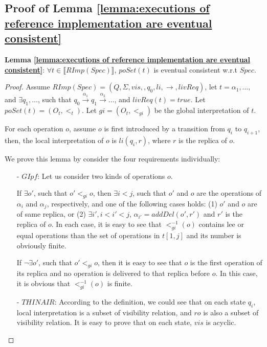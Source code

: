 {\subsection{Proof of Lemma \ref{lemma:executions of reference implementation are eventual consistent}}
\label{subsec:appendix proof of lemma executions of reference implementation are eventual consistent}

{\noindent \bf Lemma \ref{lemma:executions of reference implementation are eventual consistent}}: $\forall t \in \llbracket RImp(Spec) \rrbracket$, $poSet(t)$ is eventual consistent w.r.t $Spec$.

\begin {proof}

Assume $RImp(Spec) = (Q,\Sigma,vis,,q_0,li,\rightarrow,livReq)$, let $t = \alpha_1, \ldots, $ and $\exists q_1,\ldots$, such that $q_0 {\xrightarrow{\alpha_1}} q_1 {\xrightarrow{\alpha_2}} \ldots$, and $livReq(t) = \mathit{true}$. Let $poSet(t)=(O_t,<_t)$. Let $gi = (O_t,<_{gi})$ be the global interpretation of $t$.

For each operation $o$, assume $o$ is first introduced by a transition from $q_i$ to $q_{i+1}$, then, the local interpretation of $o$ is $li(q_i,r)$, where $r$ is the replica of $o$.

We prove this lemma by consider the four requirements individually:

\begin{itemize}
\setlength{\itemsep}{0.5pt}
\item[-] $\mathit{GIpf}$: Let us consider two kinds of operations $o$.

If $\exists o'$, such that $o' <_{gi} o$, then $\exists i < j$, such that $o'$ and $o$ are the operations of $\alpha_i$ and $\alpha_j$, respectively, and one of the following cases holds: (1) $o'$ and $o$ are of same replica, or (2) $\exists i', i < i' < j$, $\alpha_{i'}=addDel(o',r')$ and $r'$ is the replica of $o$. In each case, it is easy to see that $<^{-1}_{gi}(o)$ contains lee or equal operations than the set of operations in $t[1,j]$ and its number is obviously finite.

    If $\neg \exists o'$, such that $o' <_{gi} o$, then it is easy to see that $o$ is the first operation of its replica and no operation is delivered to that replica before $o$. In this case, it is obvious that $<^{-1}_{gi}(o)$ is finite.

\item[-] $\mathit{THINAIR}$: According to the definition, we could see that on each state $q_i$, local interpretation is a subset of visibility relation, and $ro$ is also a subset of visibility relation. It is easy to prove that on each state, $vis$ is acyclic.


\end{itemize}
\end{proof}}
